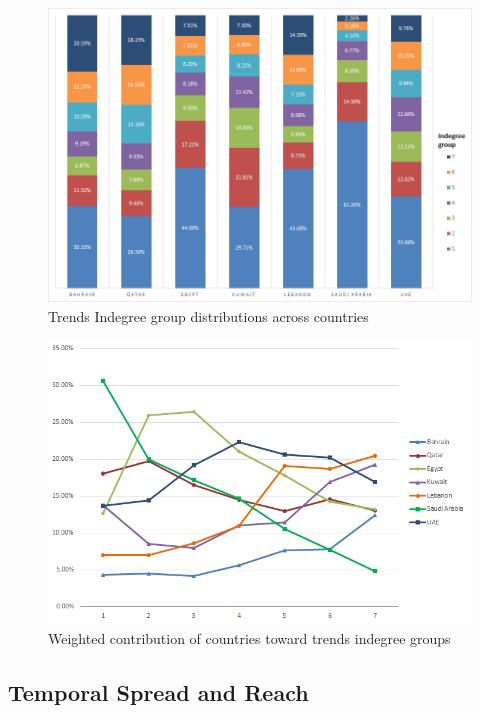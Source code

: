 \documentclass{llncs}
\begin{document}
\begin{figure}[htb]
\centering
\includegraphics[width=\columnwidth]{images/indegreegrouptrends.png}
\caption{Trends Indegree group distributions across countries}
\label{fig:indegreegrouptrends}
\end{figure}

\begin{figure}[htb]
\centering
\includegraphics[width=\columnwidth]{images/weightedcontributions.png}
\caption{Weighted contribution of countries toward trends indegree groups}
\label{fig:weightedcontributions}
\end{figure}

\subsection{Temporal Spread and Reach}
\end{document}
